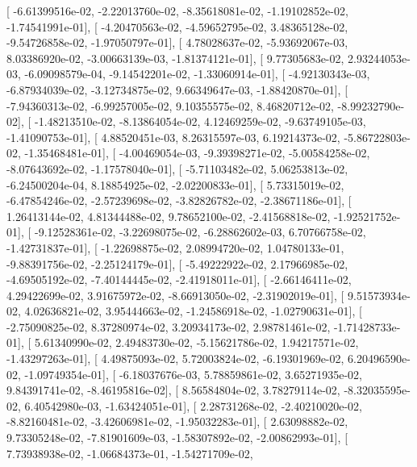 \documentclass{article}
\begin{document}
       [ -6.61399516e-02,  -2.22013760e-02,  -8.35618081e-02,
         -1.19102852e-02,  -1.74541991e-01],
       [ -4.20470563e-02,  -4.59652795e-02,   3.48365128e-02,
         -9.54726858e-02,  -1.97050797e-01],
       [  4.78028637e-02,  -5.93692067e-03,   8.03386920e-02,
         -3.00663139e-03,  -1.81374121e-01],
       [  9.77305683e-02,   2.93244053e-03,  -6.09098579e-04,
         -9.14542201e-02,  -1.33060914e-01],
       [ -4.92130343e-03,  -6.87934039e-02,  -3.12734875e-02,
          9.66349647e-03,  -1.88420870e-01],
       [ -7.94360313e-02,  -6.99257005e-02,   9.10355575e-02,
          8.46820712e-02,  -8.99232790e-02],
       [ -1.48213510e-02,  -8.13864054e-02,   4.12469259e-02,
         -9.63749105e-03,  -1.41090753e-01],
       [  4.88520451e-03,   8.26315597e-03,   6.19214373e-02,
         -5.86722803e-02,  -1.35468481e-01],
       [ -4.00469054e-03,  -9.39398271e-02,  -5.00584258e-02,
         -8.07643692e-02,  -1.17578040e-01],
       [ -5.71103482e-02,   5.06253813e-02,  -6.24500204e-04,
          8.18854925e-02,  -2.02200833e-01],
       [  5.73315019e-02,  -6.47854246e-02,  -2.57239698e-02,
         -3.82826782e-02,  -2.38671186e-01],
       [  1.26413144e-02,   4.81344488e-02,   9.78652100e-02,
         -2.41568818e-02,  -1.92521752e-01],
       [ -9.12528361e-02,  -3.22698075e-02,  -6.28862602e-03,
          6.70766758e-02,  -1.42731837e-01],
       [ -1.22698875e-02,   2.08994720e-02,   1.04780133e-01,
         -9.88391756e-02,  -2.25124179e-01],
       [ -5.49222922e-02,   2.17966985e-02,  -4.69505192e-02,
         -7.40144445e-02,  -2.41918011e-01],
       [ -2.66146411e-02,   4.29422699e-02,   3.91675972e-02,
         -8.66913050e-02,  -2.31902019e-01],
       [  9.51573934e-02,   4.02636821e-02,   3.95444663e-02,
         -1.24586918e-02,  -1.02790631e-01],
       [ -2.75090825e-02,   8.37280974e-02,   3.20934173e-02,
          2.98781461e-02,  -1.71428733e-01],
       [  5.61340990e-02,   2.49483730e-02,  -5.15621786e-02,
          1.94217571e-02,  -1.43297263e-01],
       [  4.49875093e-02,   5.72003824e-02,  -6.19301969e-02,
          6.20496590e-02,  -1.09749354e-01],
       [ -6.18037676e-03,   5.78859861e-02,   3.65271935e-02,
          9.84391741e-02,  -8.46195816e-02],
       [  8.56584804e-02,   3.78279114e-02,  -8.32035595e-02,
          6.40542980e-03,  -1.63424051e-01],
       [  2.28731268e-02,  -2.40210020e-02,  -8.82160481e-02,
         -3.42606981e-02,  -1.95032283e-01],
       [  2.63098882e-02,   9.73305248e-02,  -7.81901609e-03,
         -1.58307892e-02,  -2.00862993e-01],
       [  7.73938938e-02,  -1.06684373e-01,  -1.54271709e-02,
\end{document}
